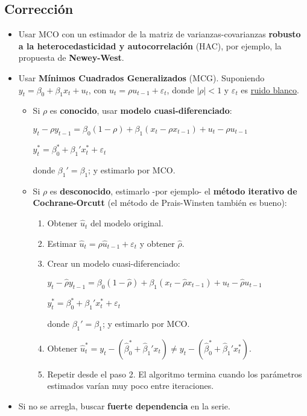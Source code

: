 \documentclass[10pt, a4paper, landscape]{extarticle}
\begin{document}
\begin{multicols}{3}
\subsection*{Corrección}

\begin{itemize}[leftmargin=*]
	\item Usar MCO con un estimador de la matriz de varianzas-covarianzas \textbf{robusto a la heterocedasticidad y autocorrelación} (HAC), por ejemplo, la propuesta de \textbf{Newey-West}.
	\item Usar \textbf{Mínimos Cuadrados Generalizados} (MCG). Suponiendo $y_t = \beta_0 + \beta_1 x_t + u_t$, con $u_t = \rho u_{t - 1} + \varepsilon_t$, donde $\lvert \rho \rvert < 1$ y $\varepsilon_t$ es \underline{ruido blanco}.
	\begin{itemize}[leftmargin=*]
		\item Si $\rho$ es \textbf{conocido}, usar \textbf{modelo cuasi-diferenciado}:
		\begin{center}
			$y_t - \rho y_{t - 1} = \beta_0 (1 - \rho) + \beta_1 (x_t - \rho x_{t - 1}) + u_t - \rho u_{t - 1}$
			
			$y_t^* = \beta_0^* + \beta_1' x_t^* + \varepsilon_t$
		\end{center}
		donde $\beta_1' = \beta_1$; y estimarlo por MCO.
		\item Si $\rho$ es \textbf{desconocido}, estimarlo -por ejemplo- el \textbf{método iterativo de Cochrane-Orcutt} (el método de Prais-Winsten también es bueno):
		\begin{enumerate}[leftmargin=*]
			\item Obtener $\hat{u}_t$ del modelo original.
			\item Estimar $\hat{u}_t = \rho \hat{u}_{t-1} + \varepsilon_t$ y obtener $\hat{\rho}$.
			\item Crear un modelo cuasi-diferenciado:
			\begin{center}
				$y_t - \hat{\rho} y_{t - 1} = \beta_0 (1 - \hat{\rho}) + \beta_1 (x_t - \hat{\rho} x_{t - 1}) + u_t - \hat{\rho} u_{t - 1}$
				
				$y_t^* = \beta_0^* + \beta_1' x_t^* + \varepsilon_t$
			\end{center}
			donde $\beta_1' = \beta_1$; y estimarlo por MCO.
			\item Obtener $\hat{u}_t^* = y_t - (\hat{\beta}_0^* + \hat{\beta}_1' x_t) \neq y_t - (\hat{\beta}_0^* + \hat{\beta}_1' x_t^*)$.
			\item Repetir desde el paso 2. El algoritmo termina cuando los parámetros estimados varían muy poco entre iteraciones.
		\end{enumerate}
	\end{itemize}
	\item Si no se arregla, buscar \textbf{fuerte dependencia} en la serie.
\end{itemize}


\end{multicols}
\end{document}
